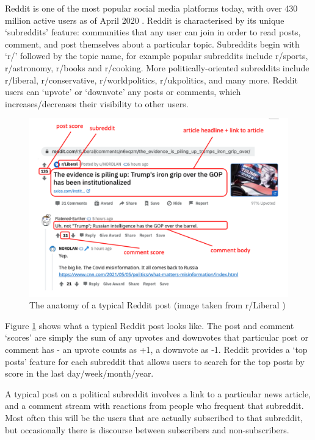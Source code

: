 Reddit is one of the most popular social media platforms today, with over 430 million active users as of April 2020 \cite{sattelberg}. Reddit is characterised by its unique `subreddits' feature: communities that any user can join in order to read posts, comment, and post themselves about a particular topic. Subreddits begin with `r/' followed by the topic name, for example popular subreddits include r/sports, r/astronomy, r/books and r/cooking. More politically-oriented subreddits include r/liberal, r/conservative, r/worldpolitics, r/ukpolitics, and many more. Reddit users can `upvote' or `downvote' any posts or comments, which increases/decreases their visibility to other users.

\begin{figure}
    \centering
    \includegraphics[scale=0.27]{0-img/annotated-reddit-post.png}
    \caption{The anatomy of a typical Reddit post (image taken from r/Liberal \cite{trump-iron-grip})}
    \label{fig:annotated-reddit-post}
\end{figure}

Figure \ref{fig:annotated-reddit-post} shows what a typical Reddit post looks like. The post and comment `scores' are simply the sum of any upvotes and downvotes that particular post or comment has - an upvote counts as +1, a downvote as -1. Reddit provides a `top posts' feature for each subreddit that allows users to search for the top posts by score in the last day/week/month/year.

A typical post on a political subreddit involves a link to a particular news article, and a comment stream with reactions from people who frequent that subreddit. Most often this will be the users that are actually subscribed to that subreddit, but occasionally there is discourse between subscribers and non-subscribers.

